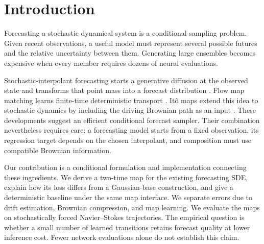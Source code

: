 \section{Introduction}
Forecasting a stochastic dynamical system is a conditional sampling problem. Given recent observations, a useful model must represent several possible futures and the relative uncertainty between them. Generating large ensembles becomes expensive when every member requires dozens of neural evaluations.

Stochastic-interpolant forecasting starts a generative diffusion at the observed state and transforms that point mass into a forecast distribution \citep{chen2024forecasting}. Flow map matching learns finite-time deterministic transport \citep{boffi2025flowmaps}. It\^o maps extend this idea to stochastic dynamics by including the driving Brownian path as an input \citep{pan2026itomaps}. These developments suggest an efficient conditional forecast sampler. Their combination nevertheless requires care: a forecasting model starts from a fixed observation, its regression target depends on the chosen interpolant, and composition must use compatible Brownian information.

Our contribution is a conditional formulation and implementation connecting these ingredients. We derive a two-time map for the existing forecasting SDE, explain how its loss differs from a Gaussian-base construction, and give a deterministic baseline under the same map interface. We separate errors due to drift estimation, Brownian compression, and map learning. We evaluate the maps on stochastically forced Navier--Stokes trajectories. The empirical question is whether a small number of learned transitions retains forecast quality at lower inference cost. Fewer network evaluations alone do not establish this claim.

